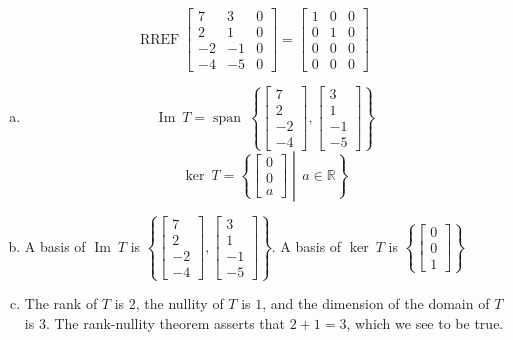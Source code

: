 \begin{exerciseAnswer} 


\[\operatorname{RREF} \left[\begin{array}{ccc}
7 & 3 & 0 \\
2 & 1 & 0 \\
-2 & -1 & 0 \\
-4 & -5 & 0
\end{array}\right] = \left[\begin{array}{ccc}
1 & 0 & 0 \\
0 & 1 & 0 \\
0 & 0 & 0 \\
0 & 0 & 0
\end{array}\right] \]


\begin{enumerate}[(a)]
\item \[\operatorname{Im}\ T = \operatorname{span}\  \left\{ \left[\begin{array}{c}
7 \\
2 \\
-2 \\
-4
\end{array}\right] , \left[\begin{array}{c}
3 \\
1 \\
-1 \\
-5
\end{array}\right] \right\} \]\[\operatorname{ker}\ T =  \left\{ \left[\begin{array}{c}
0 \\
0 \\
a
\end{array}\right] \middle|\,a\in\mathbb{R}\right\} \]
\item  A basis of \(\operatorname{Im}\ T\) is \( \left\{ \left[\begin{array}{c}
7 \\
2 \\
-2 \\
-4
\end{array}\right] , \left[\begin{array}{c}
3 \\
1 \\
-1 \\
-5
\end{array}\right] \right\} \). A basis of \(\operatorname{ker}\ T\) is \( \left\{ \left[\begin{array}{c}
0 \\
0 \\
1
\end{array}\right] \right\} \)
\item  The rank of \(T\) is \( 2 \), the nullity of \(T\) is \( 1 \), and the dimension of the domain of \(T\) is \( 3 \). The rank-nullity theorem asserts that \( 2 + 1 = 3 \), which we see to be true. 
\end{enumerate}
    
\end{exerciseAnswer}
    

